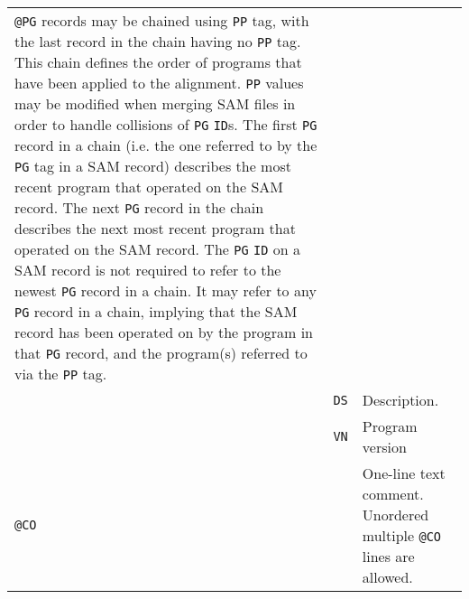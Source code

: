 \documentclass[10pt]{article}
\begin{document}
\begin{center}
\begin{longtable}{|l|l|p{13.5cm}|}
  	{\tt @PG} records may be chained using {\tt PP} tag, with the last record in the chain
	having no {\tt PP} tag. This chain defines the order of programs that have been applied to the alignment.
	{\tt PP} values may be modified when merging SAM files in order to handle collisions of {\tt PG} {\tt ID}s.
	The first {\tt PG} record in a chain (i.e. the one referred to by the {\tt PG} tag in a SAM record)
	describes the most recent program that operated on the SAM record.
	The next {\tt PG} record in the chain describes the next most recent program that
        operated on the SAM record. The {\tt PG} {\tt ID} on a SAM record is not required
        to refer to the newest {\tt PG} record in a chain.  It may refer to any {\tt PG}
        record in a chain, implying that the SAM record has been operated on by the
        program in that {\tt PG} record, and the program(s) referred to via the {\tt PP} tag. \\\cline{2-3}
  & {\tt DS} & Description.\\\cline{2-3}
  & {\tt VN} & Program version \\\cline{1-3}
  \multicolumn{2}{|l}{\tt @CO} & One-line text comment. Unordered multiple {\tt @CO} lines are allowed.\\
  \cline{1-3}
\end{longtable}
\end{center}
\end{document}
